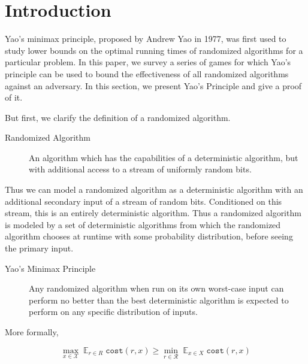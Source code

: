 \newcommand{\Expected}{\displaystyle\mathop{\mathds{E}}}
\newcommand{\argmin}{\displaystyle\mathop{\text{arg\;min}}}

\section{Introduction}

Yao's minimax principle, proposed by Andrew Yao in 1977, was first used to study lower bounds on the optimal running times of randomized algorithms for a particular problem. In this paper, we survey a series of games for which Yao's principle can be used to bound the effectiveness of all randomized algorithms against an adversary.
In this section, we present Yao's Principle and give a proof of it.

But first, we clarify the definition of a randomized algorithm.

\begin{description}
	\item[Randomized Algorithm] An algorithm which has the capabilities of a deterministic algorithm, but with additional access to a stream of uniformly random bits.
\end{description}

Thus we can model a randomized algorithm as a deterministic algorithm with an additional secondary input of a stream of random bits. Conditioned on this stream, this is an entirely deterministic algorithm. Thus a randomized algorithm is modeled by a set of deterministic algorithms from which the randomized algorithm chooses at runtime with some probability distribution, before seeing the primary input.


\begin{description}
	\item[Yao's Minimax Principle] Any randomized algorithm when run on its own worst-case input can perform no better than the best deterministic algorithm is expected to perform on any specific distribution of inputs.
\end{description}
More formally,

$$\max_{x \in \mathcal{X}} \Expected_{r \in R} \texttt{cost}(r, x) \geq \min_{r \in \mathcal{R}} \Expected_{x \in X} \texttt{cost}(r, x)$$

